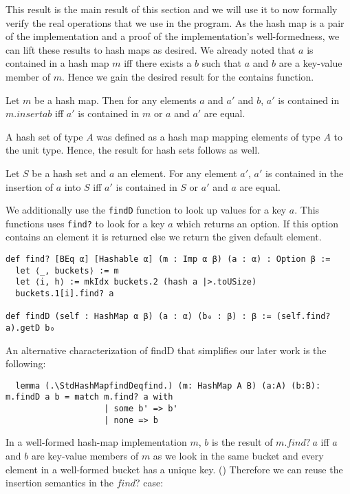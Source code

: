 This result is the main result of this section and we will use it to now formally verify the real operations that we use in the program. As the hash map is a pair of the implementation and a proof of the implementation's well-formedness, we can lift these results to hash maps as desired. We already noted that $a$ is contained in a hash map $m$ iff there exists a $b$ such that $a$ and $b$ are a key-value member of $m$. Hence we gain the desired result for the contains function.

\begin{lemma}[\StdHashMapcontainsinsert]
  Let $m$ be a hash map. Then for any elements $a$ and $a'$ and $b$, $a'$ is contained in $m.insert a b$ iff $a'$ is contained in $m$ or $a$ and $a'$ are equal.
\end{lemma}

A hash set of type $A$ was defined as a hash map mapping elements of type $A$ to the unit type. Hence, the result for hash sets follows as well.

\begin{lemma}[\StdHashSetcontainsinsert]
  Let $S$ be a hash set and $a$ an element. For any element $a'$, $a'$ is contained in the insertion of $a$ into $S$ iff $a'$ is contained in $S$ or $a'$ and $a$ are equal.
\end{lemma}

We additionally use the \lstinline|findD| function to look up values for a key $a$. This functions uses \lstinline|find?| to look for a key $a$ which returns an option. If this option contains an element it is returned else we return the given default element.

\begin{lstlisting}
def find? [BEq α] [Hashable α] (m : Imp α β) (a : α) : Option β :=
  let ⟨_, buckets⟩ := m
  let ⟨i, h⟩ := mkIdx buckets.2 (hash a |>.toUSize)
  buckets.1[i].find? a

def findD (self : HashMap α β) (a : α) (b₀ : β) : β := (self.find? a).getD b₀
\end{lstlisting}

An alternative characterization of findD that simplifies our later work is the following:

\begin{lstlisting}
  lemma (.\StdHashMapfindDeqfind.) (m: HashMap A B) (a:A) (b:B): m.findD a b = match m.find? a with
                    | some b' => b'
                    | none => b
\end{lstlisting}

In a well-formed hash-map implementation $m$, $b$ is the result of $m.find?\ a$ iff $a$ and $b$ are key-value members of $m$ as we look in the same bucket and every element in a well-formed bucket has a unique key. (\StdHashMapfindiffkv) Therefore we can reuse the insertion semantics in the $find?$ case:

